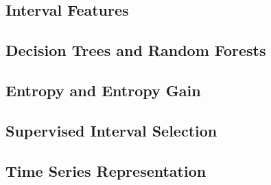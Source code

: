\subsection{Interval Features}

\subsection{Decision Trees and Random Forests}

\subsection{Entropy and Entropy Gain}

\subsection{Supervised Interval Selection}
\subsection{Time Series Representation}